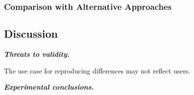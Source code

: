 
\subsubsection{Comparison with Alternative Approaches}
\label{sec:alternative}



\subsection{Discussion}

\noindent \textbf{\textit{Threats to validity.}}

\vspace{1mm}
The use case for reproducing differences may not reflect
users.

\noindent \textbf{\textit{Experimental conclusions.}}
